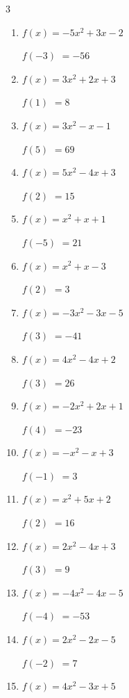\newpage
\resetdrill

\begin{multicols}{3}
\begin{enumerate}
  \itemsep=10pt
  \item $f(x)=-5x^{2}+3x-2$

$f(-3)$
        $= -56$

  \item $f(x)=3x^{2}+2x+3$

$f(1)$
        $= 8$

  \item $f(x)=3x^{2}-x-1$

$f(5)$
        $= 69$

  \item $f(x)=5x^{2}-4x+3$

$f(2)$
        $= 15$

  \item $f(x)=x^{2}+x+1$

$f(-5)$
        $= 21$

  \item $f(x)=x^{2}+x-3$

$f(2)$
        $= 3$

  \item $f(x)=-3x^{2}-3x-5$

$f(3)$
        $= -41$

  \item $f(x)=4x^{2}-4x+2$

$f(3)$
        $= 26$

  \item $f(x)=-2x^{2}+2x+1$

$f(4)$
        $= -23$

  \item $f(x)=-x^{2}-x+3$

$f(-1)$
        $= 3$

  \item $f(x)=x^{2}+5x+2$

$f(2)$
        $= 16$

  \item $f(x)=2x^{2}-4x+3$

$f(3)$
        $= 9$

  \item $f(x)=-4x^{2}-4x-5$

$f(-4)$
        $= -53$

  \item $f(x)=2x^{2}-2x-5$

$f(-2)$
        $= 7$

  \item $f(x)=4x^{2}-3x+5$


\end{enumerate}
\end{multicols}
